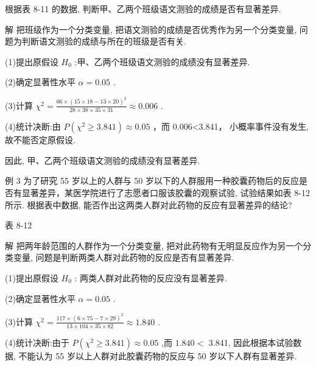 \documentclass[10pt]{article}
\begin{document}
根据表 8-11 的数据, 判断甲、乙两个班级语文测验的成绩是否有显著差异.

解 把班级作为一个分类变量, 把语文测验的成绩是否优秀作为另一个分类变量, 问题为判断语文测验的成绩与所在的班级是否有关.



(1)提出原假设 \({H}_{0}\) :甲、乙两个班级语文测验的成绩没有显著差异.

(2)确定显著性水平 \(\alpha  = {0.05}\) .

(3)计算 \({\chi }^{2} = \frac{{66} \times  {\left( {15} \times  {18} - {13} \times  {20}\right) }^{2}}{{28} \times  {38} \times  {35} \times  {31}} \approx  {0.006}\) .

(4)统计决断:由 \(P\left( {{\chi }^{2} \geq  {3.841}}\right)  \approx  {0.05}\) ，而 0.006<3.841， 小概率事件没有发生, 故不能否定原假设.

因此, 甲、乙两个班级语文测验的成绩没有显著差异.

例 3 为了研究 55 岁以上的人群与 50 岁以下的人群服用一种胶囊药物后的反应是否有显著差异，某医学院进行了志愿者口服该胶囊的观察试验, 试验结果如表 8-12 所示. 根据表中数据, 能否作出这两类人群对此药物的反应有显著差异的结论?

表 8-12

\begin{center}
\end{center}

解 把两年龄范围的人群作为一个分类变量, 把对此药物有无明显反应作为另一个分类变量, 问题是判断两类人群对此药物的反应是否有显著差异.

(1)提出原假设 \({H}_{0}\) : 两类人群对此药物的反应没有显著差异.

(2)确定显著性水平 \(\alpha  = {0.05}\) .

(3)计算 \({\chi }^{2} = \frac{{117} \times  {\left( 6 \times  {75} - 7 \times  {29}\right) }^{2}}{{13} \times  {104} \times  {35} \times  {82}} \approx  {1.840}\) .

(4)统计决断:由于 \(P\left( {{\chi }^{2} \geq  {3.841}}\right)  \approx  {0.05}\) ,而 \({1.840} <\) 3.841, 因此根据本试验数据, 不能认为 55 岁以上人群对此胶囊药物的反应与 50 岁以下人群有显著差异.
\end{document}
